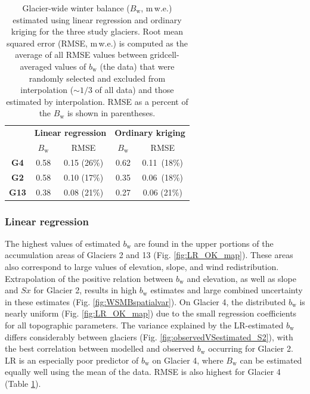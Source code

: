\documentclass[review,oneside, letterpaper]{igs}
\begin{document}
\begin{table}[]
\centering
\caption{Glacier-wide winter balance ($B_\mathrm{w}$, m\,w.e.) estimated using linear regression and ordinary kriging for the three study glaciers. Root mean squared error (RMSE, m\,w.e.) is computed as the average of all RMSE values between gridcell-averaged values of $b_\mathrm{w}$ (the data) that were randomly selected and excluded from interpolation ($\sim 1/3$ of all data) and those estimated by interpolation. RMSE as a percent of the $B_\mathrm{w}$ is shown in parentheses.}
\label{tab:WSMB&RMSE}
\begin{tabular}{c|cc|cc}
 & \multicolumn{2}{c|}{\textbf{Linear regression}} & \multicolumn{2}{c}{\textbf{Ordinary kriging}} \\
 & $B_\mathrm{w}$ & RMSE & $B_\mathrm{w}$ & RMSE \\ \hline
\textbf{G4} & 0.58 & 0.15 (26\%) & 0.62 & 0.11 \,(18\%) \\
\textbf{G2} & 0.58 & 0.10 (17\%) & 0.35 & 0.06 \,(18\%) \\
\textbf{G13} & 0.38 & 0.08 (21\%) & 0.27 & 0.06 (21\%)
\end{tabular}
\end{table}

\subsubsection{Linear regression}

The highest values of estimated $b_\mathrm{w}$ are found in the upper portions of the accumulation areas of Glaciers 2 and 13 (Fig. \ref{fig:LR_OK_map}). These areas also correspond to large values of elevation, slope, and wind redistribution. Extrapolation of the positive relation between $b_\mathrm{w}$ and elevation, as well as slope and $Sx$ for Glacier 2, results in high $b_\mathrm{w}$ estimates and large combined uncertainty in these estimates (Fig. \ref{fig:WSMBspatialvar}). On Glacier 4, the distributed $b_\mathrm{w}$ is nearly uniform (Fig. \ref{fig:LR_OK_map}) due to the small regression coefficients for all topographic parameters. The variance explained by the LR-estimated $b_\mathrm{w}$ differs considerably between glaciers (Fig. \ref{fig:observedVSestimated_S2}), with the best correlation between modelled and observed $b_\mathrm{w}$ occurring for Glacier 2. LR is an especially poor predictor of $b_\mathrm{w}$ on Glacier 4, where $B_\mathrm{w}$ can be estimated equally well using the mean of the data. RMSE is also highest for Glacier 4 (Table \ref{tab:WSMB&RMSE}). 
\end{document}
